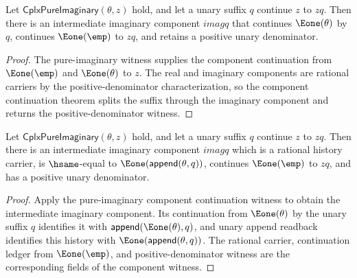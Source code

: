 \begin{theorem}
\label{thm:cplx-pure-imaginary-component-continuation-witness}
Let \(\mathsf{CplxPureImaginary}(\theta,z)\) hold, and let a unary suffix \(q\)
continue \(z\) to \(zq\). Then there is an intermediate imaginary component
\(imagq\) that continues \(\Eone(\theta)\) by \(q\), continues
\(\Eone(\emp)\) to \(zq\), and retains a positive unary denominator.
\end{theorem}
\begin{proof}
The pure-imaginary witness supplies the component continuation from
\(\Eone(\emp)\) and \(\Eone(\theta)\) to \(z\). The real and imaginary
components are rational carriers by the positive-denominator characterization,
so the component continuation theorem splits the suffix through the imaginary
component and returns the positive-denominator witness.
\end{proof}

\begin{theorem}
\label{thm:cplx-pure-imaginary-suffix-component-tail-witness}
Let \(\mathsf{CplxPureImaginary}(\theta,z)\) hold, and let a unary suffix \(q\)
continue \(z\) to \(zq\). Then there is an intermediate imaginary component
\(imagq\) which is a rational history carrier, is \(\hsame\)-equal to
\(\Eone(\mathsf{append}(\theta,q))\), continues \(\Eone(\emp)\) to \(zq\),
and has a positive unary denominator.
\end{theorem}
\begin{proof}
Apply the pure-imaginary component continuation witness to obtain the
intermediate imaginary component. Its continuation from \(\Eone(\theta)\) by
the unary suffix \(q\) identifies it with
\(\mathsf{append}(\Eone(\theta),q)\), and unary append readback identifies this
history with \(\Eone(\mathsf{append}(\theta,q))\). The rational carrier,
continuation ledger from \(\Eone(\emp)\), and positive-denominator witness are
the corresponding fields of the component witness.
\end{proof}

